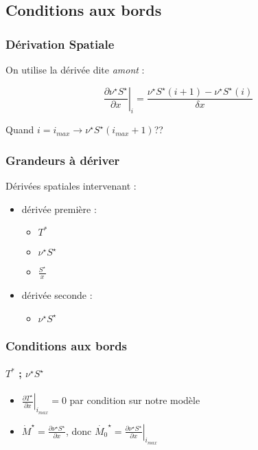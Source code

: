 \subsection{Conditions aux bords}


\begin{frame}
\frametitle{Dérivation Spatiale}

On utilise la dérivée dite \textit{amont} : 

\begin{equation*}
\left. \frac{\partial \nu^{\star} S^{\star}}{\partial x} \right|_i = \frac{\nu^{\star}S^{\star}(i+1)-\nu^{\star}S^{\star}(i)}{\delta x} 
\end{equation*}


Quand $i=i_{max} \rightarrow \nu^{\star}S^{\star}(i_{max}+1) $??

\end{frame}


\begin{frame}
\frametitle{Grandeurs à dériver}
Dérivées spatiales intervenant :

\begin{itemize}
    \item dérivée première :
    \begin{itemize}
        \item $T^*$
        \item $ \nu^{\star}S^{\star}$
        \item $\frac{S^{\star}}{x}$
    \end{itemize}
    \item dérivée seconde :
    \begin{itemize}
        \item $ \nu^{\star}S^{\star}$
    \end{itemize}
\end{itemize}

\end{frame}


\begin{frame}
\frametitle{Conditions aux bords}
\framesubtitle{$T^*$ ; $\nu^{\star} S^{\star}$}

\begin{itemize}

\item $\left.\frac{\partial T^{\star}}{\partial x}\right|_{i_{max}} =0$ par condition sur notre modèle

\item $\dot{M}^{\star} = \frac{\partial \nu^{\star} S^{\star}}{\partial x}$, donc $ \dot{M_0}^{\star} = \left. \frac{\partial \nu^{\star} S^{\star}}{\partial x} \right|_{i_{max}} $

\end{itemize}

\end{frame}

